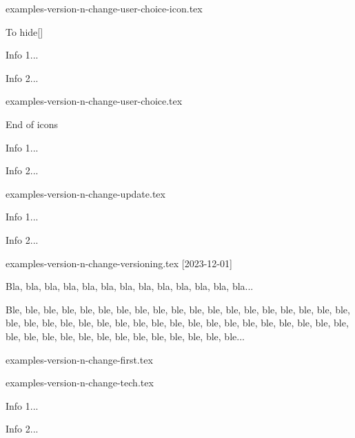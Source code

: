 \begin{filecontents*}[overwrite]{examples-version-n-change-user-choice-icon.tex}
\begin{tdoctopic}{To hide}[\faEyeSlash]
    \item Info 1...
    \item Info 2...
\end{tdoctopic}
\end{filecontents*}


\begin{filecontents*}[overwrite]{examples-version-n-change-user-choice.tex}
\begin{tdoctopic}{End of icons}
    \item Info 1...
    \item Info 2...
\end{tdoctopic}
\end{filecontents*}


\begin{filecontents*}[overwrite]{examples-version-n-change-update.tex}
\begin{tdocupdate}
    \item Info 1...
    \item Info 2...
\end{tdocupdate}
\end{filecontents*}


\begin{filecontents*}[overwrite]{examples-version-n-change-versioning.tex}
[2023-12-01]

Bla, bla, bla, bla, bla, bla, bla, bla, bla, bla, bla, bla, bla...

\bigskip %


Ble, ble, ble, ble, ble, ble, ble, ble, ble, ble, ble, ble, ble,
ble, ble, ble, ble, ble, ble, ble, ble, ble, ble, ble, ble, ble,
ble, ble, ble, ble, ble, ble, ble, ble, ble, ble, ble, ble, ble,
ble, ble, ble, ble, ble, ble, ble, ble, ble, ble, ble, ble...
\end{filecontents*}


\begin{filecontents*}[overwrite]{examples-version-n-change-first.tex}
\end{filecontents*}


\begin{filecontents*}[overwrite]{examples-version-n-change-tech.tex}
\begin{tdoctech}
    \item Info 1...
    \item Info 2...
\end{tdoctech}
\end{filecontents*}


